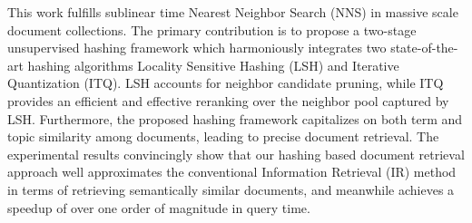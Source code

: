 This work fulfills sublinear time Nearest Neighbor Search (NNS) in massive scale document collections. The primary contribution is to propose a two-stage unsupervised hashing framework which harmoniously integrates two state-of-the-art hashing algorithms Locality Sensitive Hashing (LSH) and Iterative Quantization (ITQ). LSH accounts for neighbor candidate pruning, while ITQ provides an efficient and effective reranking over the neighbor pool captured by LSH. Furthermore, the proposed hashing framework capitalizes on both term and topic similarity among documents, leading to precise document retrieval. The experimental results convincingly show that our hashing based document retrieval approach well approximates the conventional Information Retrieval (IR) method in terms of retrieving semantically similar documents, and meanwhile achieves a speedup of over one order of magnitude in query time.
